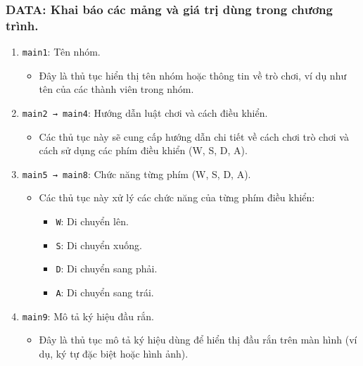 \documentclass[12pt]{article}
\begin{document}
 \subsubsection* {DATA: Khai báo các mảng và giá trị dùng trong chương trình.}
 \begin{enumerate}[label=\textbf{\arabic*.}]
   \begin{figure}[H]
  \centering
  \texttt{[image: pics/data.png]}
\end{figure}
    \item \texttt{main1}: Tên nhóm.
    \begin{itemize}
        \item Đây là thủ tục hiển thị tên nhóm hoặc thông tin về trò chơi, ví dụ như tên của các thành viên trong nhóm.
    \end{itemize}
    
    \item \texttt{main2 → main4}: Hướng dẫn luật chơi và cách điều khiển.
    \begin{itemize}
        \item Các thủ tục này sẽ cung cấp hướng dẫn chi tiết về cách chơi trò chơi và cách sử dụng các phím điều khiển (W, S, D, A).
    \end{itemize}
    
    \item \texttt{main5 → main8}: Chức năng từng phím (W, S, D, A).
    \begin{itemize}
        \item Các thủ tục này xử lý các chức năng của từng phím điều khiển:
        \begin{itemize}
            \item \texttt{W}: Di chuyển lên.
            \item \texttt{S}: Di chuyển xuống.
            \item \texttt{D}: Di chuyển sang phải.
            \item \texttt{A}: Di chuyển sang trái.
        \end{itemize}
    \end{itemize}

    \item \texttt{main9}: Mô tả ký hiệu đầu rắn.
    \begin{itemize}
        \item Đây là thủ tục mô tả ký hiệu dùng để hiển thị đầu rắn trên màn hình (ví dụ, ký tự đặc biệt hoặc hình ảnh).
    \end{itemize}


\end{enumerate}
\end{document}
